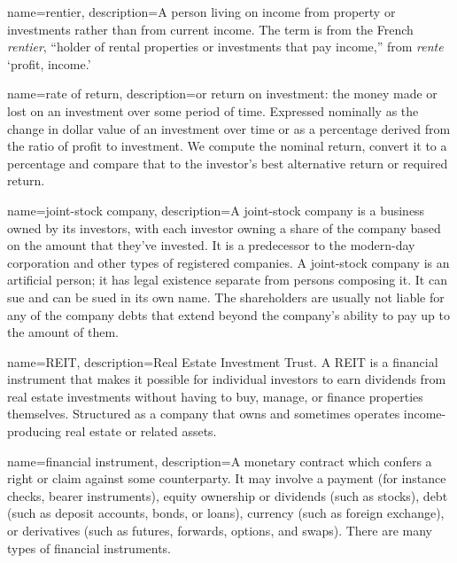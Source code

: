 {
name=rentier,
description={A person living on income from property or investments rather than from current income. The term is from the  French \textit{rentier}, ``holder of rental properties or investments that pay income,'' from \textit{rente} `profit, income.' %
}
}

{
name=rate of return,
description={or return on investment: the money made or lost on an investment over some period of time. Expressed nominally as the change in dollar value of an investment over time or  as a percentage derived from the ratio of profit to investment. We compute the nominal return, convert it to a percentage and compare that to the investor's best alternative return or required return.}
}

{
name=joint-stock company,
description={A joint-stock company is a business owned by its investors, with each investor owning a share of the company based on the amount that they've invested. It is a predecessor to the modern-day corporation and other types of registered companies. A joint-stock company is an artificial person; it has legal existence separate from persons composing it. It can sue and can be sued in its own name. The shareholders are usually not liable for any of the company debts that extend beyond the company's ability to pay up to the amount of them.}
}

{
name=REIT,
description={Real Estate Investment Trust. A REIT is a financial instrument that  makes it possible for individual investors to earn dividends from real estate investments without having to buy, manage, or finance properties themselves. Structured as a company that owns and sometimes operates income-producing real estate or related assets. %
} 
}

{
name=financial instrument,
description={A monetary contract which confers a right or claim against some counterparty. It may involve a payment (for instance checks, bearer instruments), equity ownership or dividends (such as stocks), debt (such as deposit accounts, bonds, or loans), currency (such as foreign exchange), or derivatives (such as futures, forwards, options, and swaps). There are %
many types of financial instruments.} %
}

